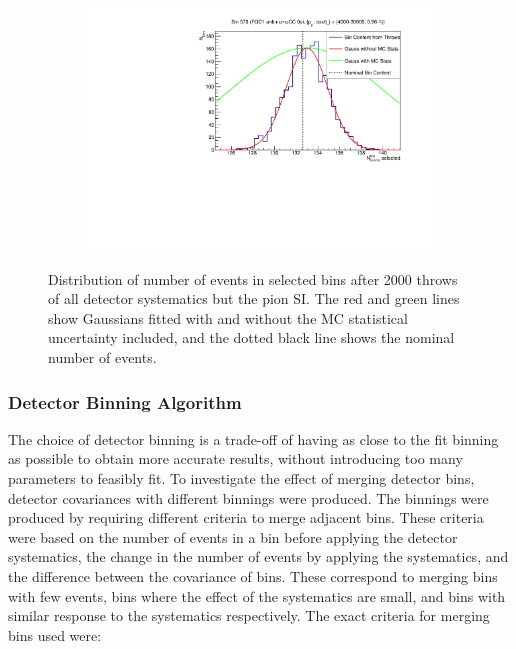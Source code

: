 \begin{figure}[h]
\begin{subfigure}{.49\textwidth}
\end{subfigure}
\begin{subfigure}{.49\textwidth}
  \centering
  \includegraphics[width=0.95\linewidth]{figs/detbin_nopisi570}
\end{subfigure}
\caption{Distribution of number of events in selected bins after 2000 throws of all detector systematics but the pion SI. The red and green lines show Gaussians fitted with and without the MC statistical uncertainty included, and the dotted black line shows the nominal number of events.}
\label{fig:detnopisibins}
\end{figure}

\subsubsection{Detector Binning Algorithm}\label{sec:detbin}

The choice of detector binning is a trade-off of having as close to the fit binning as possible to obtain more accurate results, without introducing too many parameters to feasibly fit. To investigate the effect of merging detector bins, detector covariances with different binnings were produced. The binnings were produced by requiring different criteria to merge adjacent bins. These criteria were based on the number of events in a bin before applying the detector systematics, the change in the number of events by applying the systematics, and the difference between the covariance of bins. These correspond to merging bins with few events, bins where the effect of the systematics are small, and bins with similar response to the systematics respectively. The exact criteria for merging bins used were:

